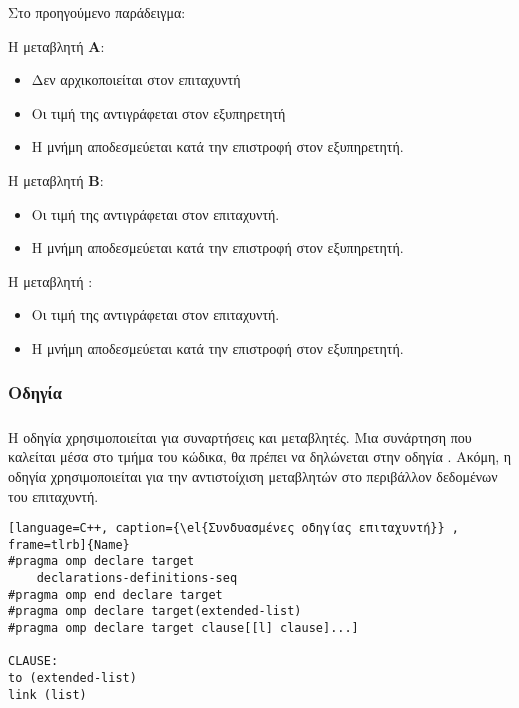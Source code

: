 Στο προηγούμενο παράδειγμα:

Η μεταβλητή \textbf{Α}:

\begin{itemize}
  \item Δεν αρχικοποιείται στον επιταχυντή
  \item Οι τιμή της αντιγράφεται στον εξυπηρετητή
  \item Η μνήμη αποδεσμεύεται κατά την επιστροφή στον εξυπηρετητή.
\end{itemize}

Η μεταβλητή \textbf{Β}:

\begin{itemize}
  \item Οι τιμή της αντιγράφεται στον επιταχυντή.
  \item Η μνήμη αποδεσμεύεται κατά την επιστροφή στον εξυπηρετητή.
\end{itemize}

Η μεταβλητή \textbf{}:

\begin{itemize}
  \item Οι τιμή της αντιγράφεται στον επιταχυντή.
  \item Η μνήμη αποδεσμεύεται κατά την επιστροφή στον εξυπηρετητή.
\end{itemize}

\subsubsection{Οδηγία \emph{}}
\subparagraph{}
Η οδηγία \emph{} χρησιμοποιείται για συναρτήσεις και μεταβλητές. Μια συνάρτηση που καλείται μέσα στο τμήμα του \emph{} κώδικα, θα πρέπει να δηλώνεται στην οδηγία \emph{}. Ακόμη, η οδηγία χρησιμοποιείται για την αντιστοίχιση \emph{} μεταβλητών στο περιβάλλον δεδομένων του επιταχυντή.



\begin{spacing}{1.1}
\begin{lstlisting}[language=C++, caption={\el{Συνδυασμένες οδηγίας επιταχυντή}} , frame=tlrb]{Name}
#pragma omp declare target
	declarations-definitions-seq
#pragma omp end declare target
#pragma omp declare target(extended-list)
#pragma omp declare target clause[[l] clause]...]

CLAUSE:
to (extended-list)
link (list)
\end{lstlisting}
\end{spacing}
